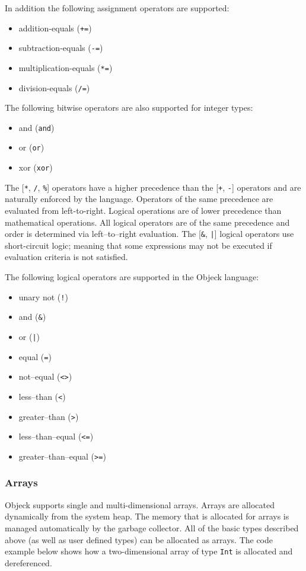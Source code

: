 \documentclass[11pt]{article}
\begin{document}
In addition the following assignment operators are supported:
\begin{itemize}
\item addition-equals (\texttt{+=})
\item subtraction-equals (\texttt{-=})
\item multiplication-equals (\texttt{*=})
\item division-equals (\texttt{/=})
\end{itemize}

The following bitwise operators are also supported for integer types:
\begin{itemize}
\item and (\texttt{and})
\item or (\texttt{or})
\item xor (\texttt{xor})
\end{itemize}

The [\texttt{*}, \texttt{/}, \texttt{\%}] operators have a higher
precedence than the [\texttt{+}, \texttt{-}] operators and are
naturally enforced by the language. Operators of the same precedence
are evaluated from left-to-right.  Logical operations are of lower
precedence than mathematical operations. All logical operators are of
the same precedence and order is determined via left--to--right
evaluation.  The [\texttt{\&}, \texttt{|}] logical operators use
short-circuit logic; meaning that some expressions may not be executed
if evaluation criteria is not satisfied.

The following logical operators are supported in the Objeck language:
\begin{itemize}
\item unary not (\texttt{!})
\item and (\texttt{\&})
\item or (\texttt{|})
\item equal (\texttt{=})
\item not--equal (\texttt{<>})
\item less--than (\texttt{<})
\item greater--than (\texttt{>})
\item less--than--equal (\texttt{<=})
\item greater--than--equal (\texttt{>=})
\end{itemize}

\subsubsection{Arrays}
Objeck supports single and multi-dimensional arrays.  Arrays are
allocated dynamically from the system heap.  The memory that is
allocated for arrays is managed automatically by the garbage
collector.  All of the basic types described above (as well as user
defined types) can be allocated as arrays.  The code example below
shows how a two-dimensional array of type \texttt{Int} is allocated
and dereferenced.
\end{document}
